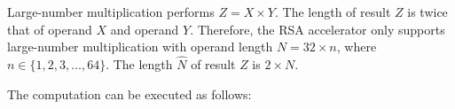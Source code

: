 \documentclass[main\_\_EN.tex]{subfiles}
\begin{document}
Large-number multiplication performs \begin{math}Z = X \times Y\end{math}. The length of result \begin{math}Z\end{math} is twice that of operand \begin{math}X\end{math} and operand \begin{math}Y\end{math}. Therefore, the RSA accelerator only supports large-number multiplication with operand length \begin{math}N = 32 \times n\end{math}, where \begin{math}n \in \{ 1, 2, 3, \dots, 64\}\end{math}. The length \begin{math}\hat{N}\end{math} of result \begin{math}Z\end{math} is \begin{math}2 \times N\end{math}.

The computation can be executed as follows:
\end{document}
